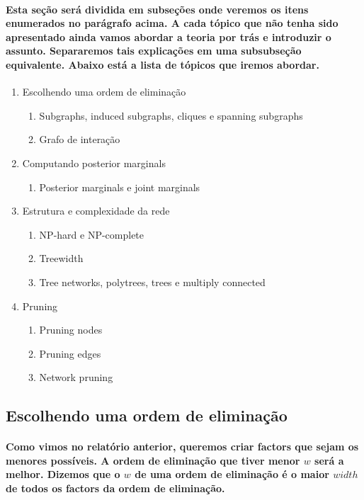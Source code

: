 \documentclass[a4paper,10pt]{article}
\theoremstyle{plain}
\begin{document}
\paragraph{
  Esta seção será dividida em subseções onde veremos os itens enumerados no parágrafo acima. A cada
  tópico que não tenha sido apresentado ainda vamos abordar a teoria por trás e introduzir o 
  assunto. Separaremos tais explicações em uma subsubseção equivalente. Abaixo está a lista de 
  tópicos que iremos abordar.
}

\begin{enumerate}
  \item Escolhendo uma ordem de eliminação
    \begin{enumerate}[label*=\arabic*.]
      \item Subgraphs, induced subgraphs, cliques e spanning subgraphs
      \item Grafo de interação
    \end{enumerate}
  \item Computando posterior marginals
    \begin{enumerate}[label*=\arabic*.]
      \item Posterior marginals e joint marginals
    \end{enumerate}
  \item Estrutura e complexidade da rede
    \begin{enumerate}[label*=\arabic*.]
      \item NP-hard e NP-complete
      \item Treewidth
      \item Tree networks, polytrees, trees e multiply connected
    \end{enumerate}
  \item Pruning
    \begin{enumerate}[label*=\arabic*.]
      \item Pruning nodes
      \item Pruning edges
      \item Network pruning
    \end{enumerate}
\end{enumerate}

\subsection{Escolhendo uma ordem de eliminação}

\paragraph{
  Como vimos no relatório anterior\cite{report-2}, queremos criar factors que sejam os menores 
  possíveis. A ordem de eliminação que tiver menor $w$ será a melhor. Dizemos que o $w$ de uma 
  ordem de eliminação é o maior $width$ de todos os factors da ordem de eliminação. 
}
\end{document}
